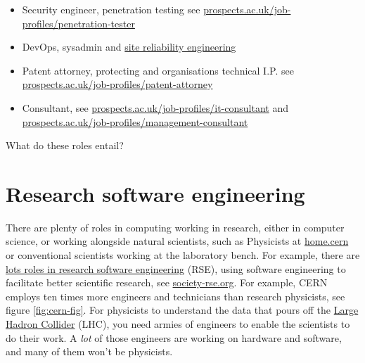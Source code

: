 \documentclass[
]{book}
\begin{document}
\begin{itemize}
\item
  Security engineer, penetration testing see \href{https://www.prospects.ac.uk/job-profiles/penetration-tester}{prospects.ac.uk/job-profiles/penetration-tester}
\item
  DevOps, sysadmin and \href{https://en.wikipedia.org/wiki/Site_reliability_engineering}{site reliability engineering}
\item
  Patent attorney, protecting and organisations technical I.P. see \href{https://www.prospects.ac.uk/job-profiles/patent-attorney}{prospects.ac.uk/job-profiles/patent-attorney}
\item
  Consultant, see \href{https://www.prospects.ac.uk/job-profiles/it-consultant}{prospects.ac.uk/job-profiles/it-consultant} and \href{https://www.prospects.ac.uk/job-profiles/management-consultant}{prospects.ac.uk/job-profiles/management-consultant}
\end{itemize}

What do these roles entail?

\hypertarget{rse}{%
\section{Research software engineering}\label{rse}}

There are plenty of roles in computing working in research, either in computer science, or working alongside natural scientists, such as Physicists at \href{https://home.cern/}{home.cern} or conventional scientists working at the laboratory bench. For example, there are \href{https://dx.doi.org/10.1038/d41586-022-01516-2}{lots roles in research software engineering} (RSE), using software engineering to facilitate better scientific research, see \href{https://society-rse.org/}{society-rse.org}.\citep{rses} For example, CERN employs ten times more engineers and technicians than research physicists, see figure \ref{fig:cern-fig}. For physicists to understand the data that pours off the \href{https://en.wikipedia.org/wiki/Large_Hadron_Collider}{Large Hadron Collider} (LHC), you need armies of engineers to enable the scientists to do their work. A \emph{lot} of those engineers are working on hardware and software, and many of them won't be physicists. \citep{hullcern}
\end{document}
